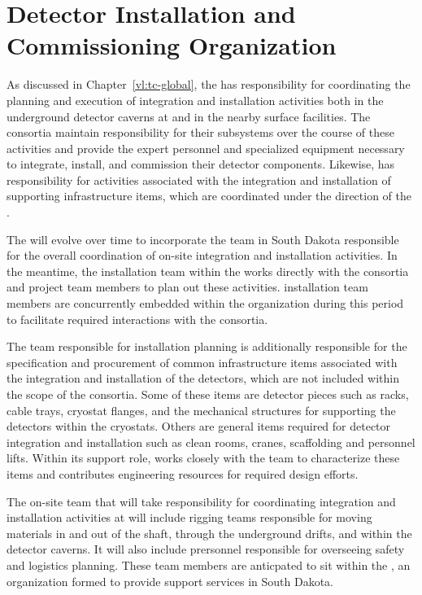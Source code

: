 \chapter{Detector Installation and Commissioning Organization}
\label{ch:tc-jpo}

As discussed in Chapter~\ref{vl:tc-global}, the  has
responsibility for coordinating the planning and execution of 
 integration and installation activities both 
in the underground detector caverns at  and in the 
nearby surface facilities.  The  consortia maintain 
responsibility for their subsystems over the course of these 
activities and provide the expert personnel and specialized 
equipment necessary to integrate, install, and commission their 
detector components.  Likewise,  has responsibility 
for activities associated with the integration and installation 
of supporting infrastructure items, which are coordinated under 
the direction of the .       

The  will evolve over time to incorporate the team in South 
Dakota responsible for the overall coordination of on-site integration 
and installation activities.  In the meantime, the installation team 
within the  works directly with the  consortia 
and  project team members to plan out these activities.  
 installation team members are concurrently embedded 
within the   organization during this period to 
facilitate required interactions with the  consortia. 

The  team responsible for installation planning is additionally 
responsible for the specification and procurement of common infrastructure 
items associated with the integration and installation of the detectors, 
which are not included within the scope of the  consortia.  
Some of these items are detector pieces such as racks, cable trays, cryostat 
flanges, and the mechanical structures for supporting the detectors within 
the cryostats.  Others are general items required for detector integration 
and installation such as clean rooms, cranes, scaffolding and personnel 
lifts.  Within its support role,   works closely with 
the  team to characterize these items and contributes engineering 
resources for required design efforts.

The on-site  team that will take responsibility for coordinating
integration and installation activities at  will include rigging 
teams responsible for moving materials in and out of the shaft, through the 
underground drifts, and within the detector caverns.  It will also include 
prersonnel responsible for overseeing safety and logistics planning.  These 
team members are anticpated to sit within the , an organization 
formed to provide  support services in South Dakota.    

